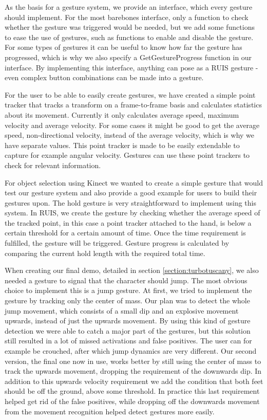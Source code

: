 \documentclass[12pt,a4paper,oneside,pdftex]{report}
\begin{document}
As the basis for a gesture system, we provide an interface, which every gesture should implement. For the most barebones interface, only a function to check whether the gesture was triggered would be needed, but we add some functions to ease the use of gestures, such as functions to enable and disable the gesture. For some types of gestures it can be useful to know how far the gesture has progressed, which is why we also specify a GetGestureProgress function in our interface. By implementing this interface, anything can pose as a RUIS gesture - even complex button combinations can be made into a gesture. 

For the user to be able to easily create gestures, we have created a simple point tracker that tracks a transform on a frame-to-frame basis and calculates statistics about its movement. Currently it only calculates average speed, maximum velocity and average velocity. For some cases it might be good to get the average speed, non-directional velocity, instead of the average velocity, which is why we have separate values. This point tracker is made to be easily extendable to capture for example angular velocity. Gestures can use these point trackers to check for relevant information.

For object selection using Kinect we wanted to create a simple gesture that would test our gesture system and also provide a good example for users to build their gestures upon. The hold gesture is very straightforward to implement using this system. In RUIS, we create the gesture by checking whether the average speed of the tracked point, in this case a point tracker attached to the hand, is below a certain threshold for a certain amount of time. Once the time requirement is fulfilled, the gesture will be triggered. Gesture progress is calculated by comparing the current hold length with the required total time. 

When creating our final demo, detailed in section \ref{section:turbotuscany}, we also needed a gesture to signal that the character should jump. The most obvious choice to implement this is a jump gesture. At first, we tried to implement the gesture by tracking only the center of mass. Our plan was to detect the whole jump movement, which consists of a small dip and an explosive movement upwards, instead of just the upwards movement. By using this kind of gesture detection we were able to catch a major part of the gestures, but this solution still resulted in a lot of missed activations and false positives. The user can for example be crouched, after which jump dynamics are very different. Our second version, the final one now in use, works better by still using the center of mass to track the upwards movement, dropping the requirement of the downwards dip. In addition to this upwards velocity requirement we add the condition that both feet should be off the ground, above some threshold. In practice this last requirement helped get rid of the false positives, while dropping off the downwards movement from the movement recognition helped detect gestures more easily.
\end{document}
